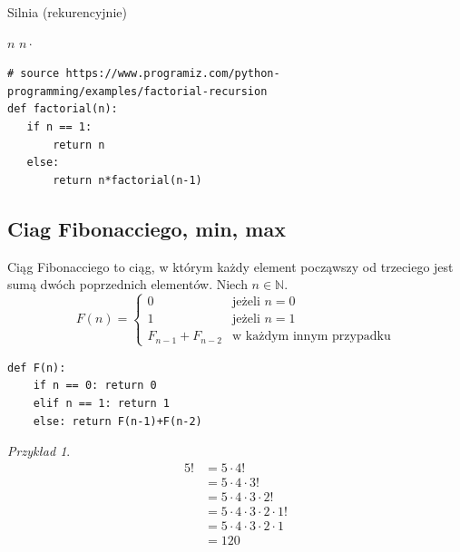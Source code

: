 \documentclass[10pt, oneside]{article}
\theoremstyle{remark}
\newtheorem*{example}{Przykład}
\begin{document}
\begin{algorithm}
    \caption{Silnia (rekurencyjnie)}
    \label{factorial_recursive}
    \begin{algorithmic}[1] %
            		\State \Return $n$
            	\Else
            		\State \Return $n \cdot$
            	\EndIf
        \EndFunction
    \end{algorithmic}
\end{algorithm}


\begin{verbatim}
# source https://www.programiz.com/python-programming/examples/factorial-recursion
def factorial(n):
   if n == 1:
       return n
   else:
       return n*factorial(n-1)
\end{verbatim}

\subsection{Ciag Fibonacciego, min, max}
Ciąg Fibonacciego to ciąg, w którym każdy element począwszy od trzeciego jest sumą dwóch poprzednich elementów.
Niech $n \in \mathbb{N}$.
\begin{equation*}
F(n) = \begin{cases}
0 &\text{jeżeli $n =0 $}\\
1 &\text{jeżeli $n =1 $}\\
F_{n-1}+F_{n-2} &\text{w każdym innym przypadku}
\end{cases}
\end{equation*}

\begin{verbatim}
def F(n):
    if n == 0: return 0
    elif n == 1: return 1
    else: return F(n-1)+F(n-2)
\end{verbatim}

\begin{example}
\begin{align*}
5! &= 5 \cdot 4! \\
&= 5 \cdot 4 \cdot 3! \\  
&= 5 \cdot 4 \cdot 3 \cdot 2! \\  
&= 5 \cdot 4 \cdot 3 \cdot 2 \cdot 1! \\
&= 5 \cdot 4 \cdot 3 \cdot 2 \cdot 1 \\
&= 120
\end{align*}	
\end{example}
\end{document}
